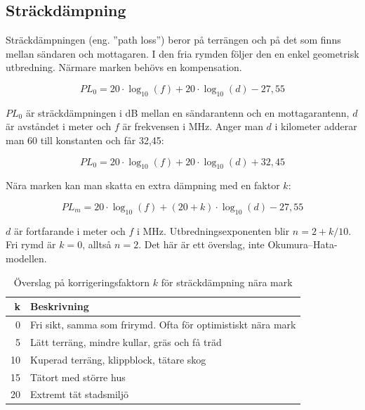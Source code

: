 \subsection{Sträckdämpning}

Sträckdämpningen (eng. ''path loss'') beror på terrängen och på det som
finns mellan sändaren och mottagaren. I den fria rymden följer den en
enkel geometrisk utbredning. Närmare marken behövs en kompensation.

\begin{equation}
	PL_0 = 20 \cdot \log_{10}(f) + 20 \cdot \log_{10}(d) - 27,55
\end{equation}

$PL_0$ är sträckdämpningen i dB mellan en sändarantenn och en
mottagarantenn, $d$ är avståndet i meter och $f$ är frekvensen i MHz.
Anger man $d$ i kilometer adderar man 60 till konstanten och får 32,45:

\begin{equation}
	PL_0 = 20 \cdot \log_{10}(f) + 20 \cdot \log_{10}(d) + 32,45
\end{equation}

Nära marken kan man skatta en extra dämpning med en faktor $k$:

\begin{equation}
	PL_m = 20 \cdot \log_{10}(f) + (20+k) \cdot \log_{10}(d) - 27,55
\end{equation}

$d$ är fortfarande i meter och $f$ i MHz. Utbredningsexponenten blir
$n = 2 + k/10$. Fri rymd är $k = 0$, alltså $n = 2$. Det här är ett
överslag, inte Okumura--Hata-modellen.

\begin{table}[H]
	\centering
	\begin{tabular}{r|l}
		\textbf{k} & \textbf{Beskrivning} \\ \hline
		0 & Fri sikt, samma som frirymd. Ofta för optimistiskt nära mark \\
		5 & Lätt terräng, mindre kullar, gräs och få träd \\
		10 & Kuperad terräng, klippblock, tätare skog \\
		15 & Tätort med större hus \\
		20 & Extremt tät stadsmiljö \\
	\end{tabular}
	\caption{Överslag på korrigeringsfaktorn $k$ för sträckdämpning nära mark}
	\label{tab:frirum-faktor}
\end{table}

